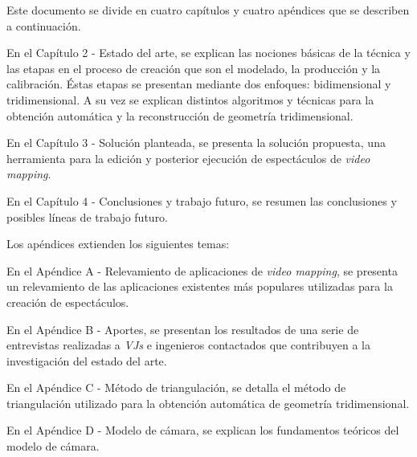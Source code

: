 Este documento se divide en cuatro capítulos y cuatro apéndices que se describen a continuación.

En el Capítulo 2 - Estado del arte, se explican las nociones básicas de la técnica y las etapas en el proceso de creación que son el modelado, la producción y la calibración. Éstas etapas se presentan mediante dos enfoques: bidimensional y tridimensional. A su vez se explican distintos algoritmos y técnicas para la obtención automática y la reconstrucción de geometría tridimensional.

En el Capítulo 3 - Solución planteada, se presenta la solución propuesta, una herramienta para la edición y posterior ejecución de espectáculos de \emph{video mapping}.

En el Capítulo 4 - Conclusiones y trabajo futuro, se resumen las conclusiones y posibles líneas de trabajo futuro.

Los apéndices extienden los siguientes temas:

En el Apéndice A - Relevamiento de aplicaciones de \emph{video mapping}, se presenta un relevamiento de las aplicaciones existentes más populares utilizadas para la creación de espectáculos.

En el Apéndice B - Aportes, se presentan los resultados de una serie de entrevistas realizadas a \emph{VJs} e ingenieros contactados que contribuyen a la investigación del estado del arte.

En el Apéndice C - Método de triangulación, se detalla el método de triangulación utilizado para la obtención automática de geometría tridimensional.

En el Apéndice D - Modelo de cámara, se explican los fundamentos teóricos del modelo de cámara.


